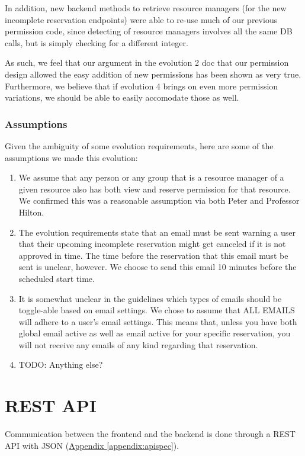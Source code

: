 \documentclass[12pt]{article}
\begin{document}
In addition, new backend methods to retrieve resource managers (for the new incomplete reservation endpoints) were able to re-use much of our previous permission code, since detecting of resource managers involves all the same DB calls, but is simply checking for a different integer. 

As such, we feel that our argument in the evolution 2 doc that our permission design allowed the easy addition of new permissions has been shown as very true. Furthermore, we believe that if evolution 4 brings on even more permission variations, we should be able to easily accomodate those as well. 



\subsubsection{Assumptions}
Given the ambiguity of some evolution requirements, here are some of the assumptions we made this evolution:
\begin{enumerate}
    \item We assume that any person or any group that is a resource manager of a given resource also has both view and reserve permission for that resource. We confirmed this was a reasonable assumption via both Peter and Professor Hilton. 
    \item The evolution requirements state that an email must be sent warning a user that their upcoming incomplete reservation might get canceled if it is not approved in time. The time before the reservation that this email must be sent is unclear, however. We choose to send this email 10 minutes before the scheduled start time. 
    \item It is somewhat unclear in the guidelines which types of emails should be toggle-able based on email settings. We chose to assume that ALL EMAILS will adhere to a user's email settings. This means that, unless you have both global email active as well as email active for your specific reservation, you will not receive any emails of any kind regarding that reservation. 
    \item {\huge TODO: Anything else?} 
\end{enumerate}



\section{REST API}
\label{sec:REST}
Communication between the frontend and the backend is done through a REST API with JSON (\hyperref[appendix:apispec]{Appendix \ref{appendix:apispec}}).
\end{document}
